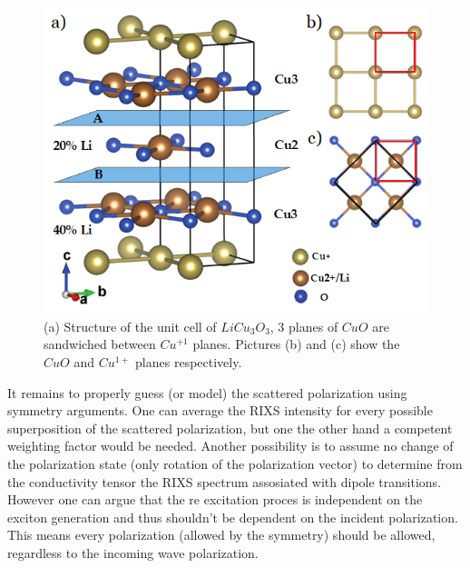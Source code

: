 \documentclass[twocolumn,amsmath,superscriptaddress,amssymb]{revtex4-1}
\begin{document}
\begin{figure}[t!]
        \includegraphics[width=0.85\columnwidth, height = 6 cm]{UnitCell.png}
\caption{(a) Structure of the unit cell of $LiCu_3O_3$, 3 planes of $CuO$ are sandwiched between $Cu^{+1}$ planes. Pictures (b) and (c) show the $CuO$ and $Cu^{1+}$ planes respectively. }
\label{UnitCell} 
\end{figure}
It remains to properly guess (or model) the scattered polarization using symmetry arguments. One can average the RIXS intensity for every possible superposition of the scattered polarization, but one the other hand a competent weighting factor would be needed.  Another possibility is to assume no change of the polarization state (only rotation of the polarization vector) to determine from the conductivity tensor the RIXS spectrum assosiated with dipole transitions. However one can argue that the re excitation proces is independent on the exciton generation and thus shouldn't be dependent on the incident polarization. This means every polarization (allowed by the symmetry) should be allowed, regardless to the incoming wave polarization.
%
\end{document}

